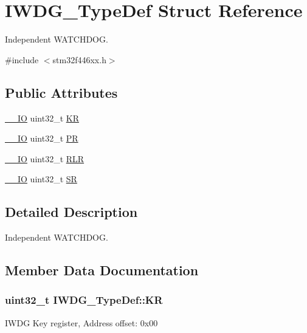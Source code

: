 \hypertarget{struct_i_w_d_g___type_def}{}\section{I\+W\+D\+G\+\_\+\+Type\+Def Struct Reference}
\label{struct_i_w_d_g___type_def}


Independent W\+A\+T\+C\+H\+D\+OG.  




{\ttfamily \#include $<$stm32f446xx.\+h$>$}

\subsection*{Public Attributes}
\begin{DoxyCompactItemize}
\item 
\hyperlink{core__sc300_8h_aec43007d9998a0a0e01faede4133d6be}{\+\_\+\+\_\+\+IO} uint32\+\_\+t \hyperlink{struct_i_w_d_g___type_def_a63089aaa5f4ad34ee2677ebcdee49cd9}{KR}
\item 
\hyperlink{core__sc300_8h_aec43007d9998a0a0e01faede4133d6be}{\+\_\+\+\_\+\+IO} uint32\+\_\+t \hyperlink{struct_i_w_d_g___type_def_a5f2717885ff171e686e0347af9e6b68d}{PR}
\item 
\hyperlink{core__sc300_8h_aec43007d9998a0a0e01faede4133d6be}{\+\_\+\+\_\+\+IO} uint32\+\_\+t \hyperlink{struct_i_w_d_g___type_def_aa3703eaa40e447dcacc69c0827595532}{R\+LR}
\item 
\hyperlink{core__sc300_8h_aec43007d9998a0a0e01faede4133d6be}{\+\_\+\+\_\+\+IO} uint32\+\_\+t \hyperlink{struct_i_w_d_g___type_def_a9bbfbe921f2acfaf58251849bd0a511c}{SR}
\end{DoxyCompactItemize}


\subsection{Detailed Description}
Independent W\+A\+T\+C\+H\+D\+OG. 

\subsection{Member Data Documentation}
\subsubsection[{\texorpdfstring{KR}{KR}}]{ uint32\+\_\+t I\+W\+D\+G\+\_\+\+Type\+Def\+::\+KR}\hypertarget{struct_i_w_d_g___type_def_a63089aaa5f4ad34ee2677ebcdee49cd9}{}\label{struct_i_w_d_g___type_def_a63089aaa5f4ad34ee2677ebcdee49cd9}
I\+W\+DG Key register, Address offset\+: 0x00 
